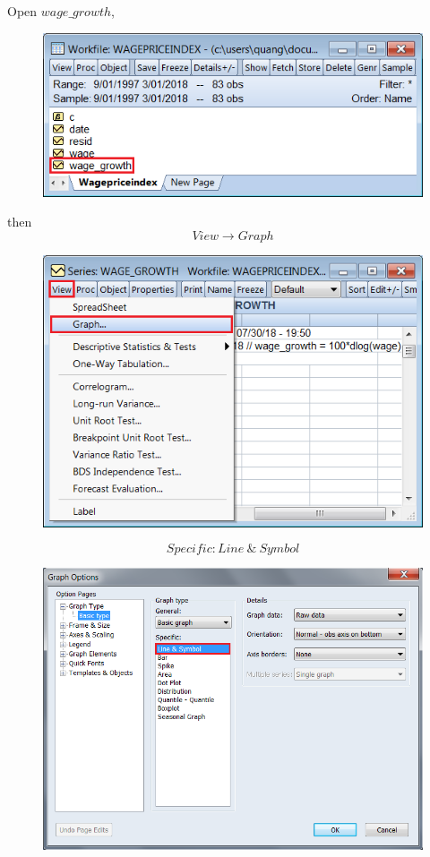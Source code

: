 \documentclass[12pt]{report}
\begin{document}
\noindent Open $wage\_growth$, \begin{figure}[H]
	\centerline{\includegraphics{2018sem2_q2_8}}
\end{figure}
\vspace{-\baselineskip} then $$View \to Graph$$ \begin{figure}[H]
	\centerline{\includegraphics{2018sem2_q2_11}}
\end{figure}
\vspace{-\baselineskip} $$Specific: Line\ \&\ Symbol$$
\begin{figure}[H]
	\centerline{\includegraphics{2018sem2_q2_4}}
\end{figure}
\end{document}
